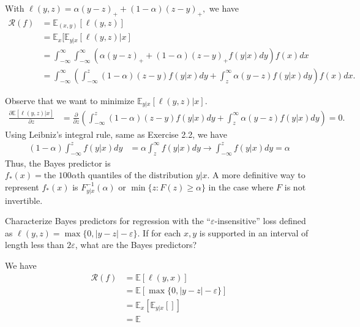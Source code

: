 \begin{tcolorbox}[title=Solution, breakable]
With $\ell(y,z)=\alpha(y-z)_{+} + (1-\alpha)(z-y)_{+},$ we have
\begin{align*}
\mathcal{R}(f) &= \mathbb{E}_{(x,y)}[\ell(y,z)] \\
&= \mathbb{E}_{x}[\mathbb{E}_{y|x}[\ell(y,z)|x] \\
&= \int_{-\infty}^{\infty} \int_{-\infty}^{\infty}(\alpha(y-z)_{+} + (1-\alpha)(z-y)_{+} f(y|x) dy )f(x) dx \\
&= \int_{-\infty}^{\infty}(\int_{-\infty}^z (1-\alpha)(z-y)f(y|x)dy + \int_{z}^{\infty}\alpha(y-z)f(y|x)dy   )f(x)dx.
\end{align*}

Observe that we want to minimize $\mathbb{E}_{y|x}[\ell(y,z)|x]$. 
\begin{align*}
\frac{\partial \mathbb{E}[\ell(y,z)|x]}{\partial z} &= \frac{\partial}{\partial z} \left(\int_{-\infty}^z (1-\alpha)(z-y)f(y|x)dy + \int_{z}^{\infty}\alpha(y-z)f(y|x)dy\right)=0.
\end{align*}
Using Leibniz's integral rule, same as Exercise 2.2, we have 
\begin{align*}
(1-\alpha)\int_{-\infty}^zf(y|x)dy &= \alpha \int_{z}^{\infty}f(y|x)dy
\to \int_{-\infty}^z f(y|x) dy = \alpha
\end{align*}
Thus, the Bayes predictor is $f_*(x)=\text{the } 100\alpha \text{th quantiles of the distribution }y|x$. A more definitive way to represent
$f_*(x)$ is $F^{-1}_{y|x}(\alpha)$ or $\min \{z: F(z) \ge \alpha\}$ in the case where $F$ is not invertible.
\end{tcolorbox}

\begin{exercise}[2.4]
Characterize Bayes predictors for regression with the “$\varepsilon$-insensitive”
loss defined as $\ell(y, z) = \max \{0, |y-z| - \varepsilon \}$. If for each $x, y$ is supported in an interval
of length less than $2\varepsilon$, what are the Bayes predictors?
\end{exercise}


\begin{tcolorbox}[breakable, title=Solution]
We have
\begin{align*}
    \mathcal{R}(f) &= \mathbb{E}[\ell(y, x)]  \\
    &= \mathbb{E}[\max \{0, |y-z| - \varepsilon\}] \\
    &= \mathbb{E}_x[\mathbb{E}_{y|x}[]] \\
    &= \mathbb{E}
\end{align*}
\end{tcolorbox}


